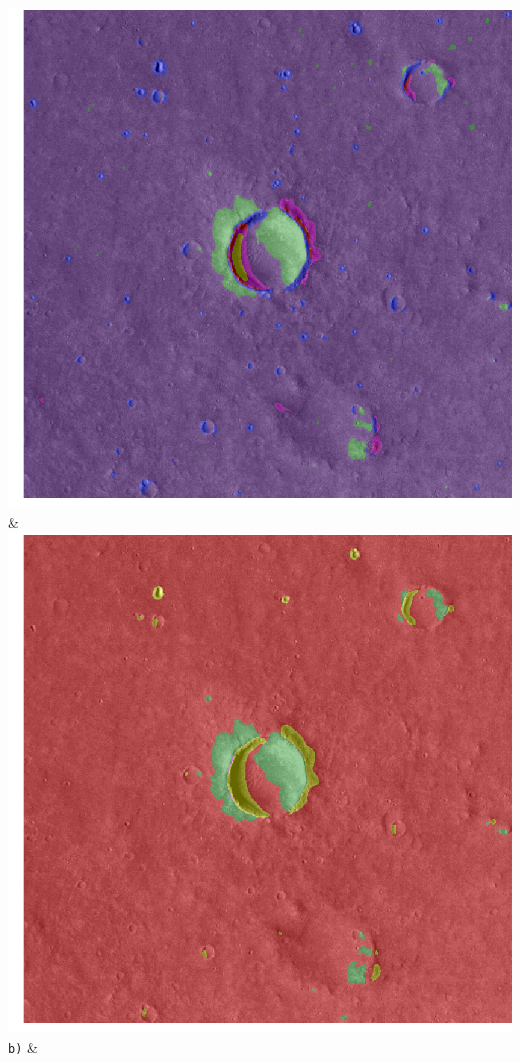 \begin{table}[h!]
\begin{tabularx}{\textwidth}
		\includegraphics[width=0.9\linewidth]{images/gen/convolution_number/p03_01.png_5.png} &
		\includegraphics[width=0.9\linewidth]{images/gen/convolution_number/p03_01.png_6.png} \\
		\texttt{b)} &

\end{tabularx}
\end{table}
